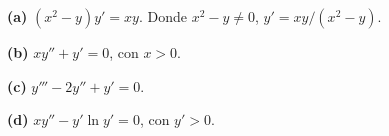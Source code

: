 \noindent\textbf{(a)} $(x^2-y)y'=xy$. Donde $x^2-y\ne0$, $y'=xy/(x^2-y)$.

\noindent\textbf{(b)} $xy''+y'=0$, con $x>0$.

\noindent\textbf{(c)} $y'''-2y''+y'=0$.

\noindent\textbf{(d)} $xy''-y'\ln y'=0$, con $y'>0$.
